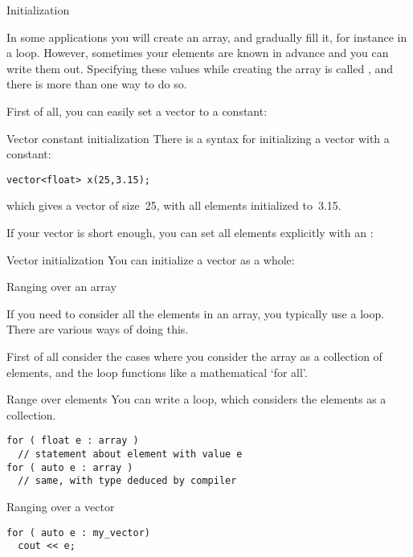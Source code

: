  {Initialization}

In some applications you will create an array, and gradually fill it,
for instance in a loop. However, sometimes your elements are known in
advance and you can write them out. Specifying these values while
creating the array is called , and
there is more than one way to do so.

First of all, you can easily set a vector to a constant:

\begin{block}{Vector constant initialization}
  \label{sl:vector-initconst}
  There is a syntax for initializing a vector with a constant:
\begin{lstlisting}
vector<float> x(25,3.15);
\end{lstlisting}
which gives a vector of size~25, with all elements initialized to~3.15.
\end{block}

If your vector is short enough, you can set all elements explicitly with an
:

\begin{block}{Vector initialization}
  \label{sl:vector-init}
  You can initialize a vector as a whole:
\end{block}

 {Ranging over an array}
\label{sec:arrayrange}

If you need to consider all the elements in an array, you typically
use a  loop. There are various ways of doing this.

First of all consider the cases where you consider the array as a
collection of elements, and the loop functions like a mathematical
`for all'.

\begin{block}{Range over elements}
  \label{sl:array-range}
  You can write a  loop, which
  considers the elements as a collection.
\begin{lstlisting}
for ( float e : array )
  // statement about element with value e
for ( auto e : array )
  // same, with type deduced by compiler
\end{lstlisting}

\end{block}

\begin{block}{Ranging over a vector}
  \label{sl:vector-range}
\begin{lstlisting}
for ( auto e : my_vector)
  cout << e;
\end{lstlisting}
\end{block}

